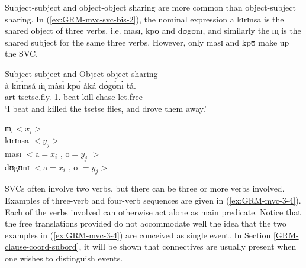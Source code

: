 


Subject-subject and object-object sharing are more common than object-subject
sharing. In (\ref{ex:GRM-mvc-svc-bis-2}), the nominal expression {\sls a 
 kɪrɪnsa} is the shared object of three verbs, i.e. {\sls masɪ}, {\sls kpʊ} and {\sls dʊgʊnɪ}, and similarly the  {\sls m̩} is the shared subject for the same three verbs. However, only {\sls masɪ} and {\sls kpʊ}  make up the SVC. 

\begin{exe}

\ex\label{ex:GRM-mvc-svc-bis-2}{\rm Subject-subject and Object-object sharing}\\
\gll à  kɪ̀rɪ̀nsá   m̩̀   màsɪ̀   kpʊ́ àká dʊ̀gʊ̀nɪ̀ tá.\\
{\sc art}  tsetse.fly.{\pl}   {1.\sg}    beat   kill   {\conn} 
chase   let.free\\
\glt `I beat and killed the tsetse flies, and drove them away.'

{\sls m̩} $<x_i>$\\
{\sls kɪrɪnsa} $<y_j>$\\
{\sls masɪ} $<${\sc a}$ =  x_i$ ,  {\sc o}$=y_j$  $> $\\
{\sls dʊgʊnɪ} $<${\sc a}$ = x_i$ , {\sc o} $= y_j  >$\\
 
\end{exe}

SVCs often involve two verbs, but there can be three or more verbs involved. 
Examples of three-verb and four-verb sequences are given in
(\ref{ex:GRM-mvc-3-4}). Each of the verbs involved can otherwise act alone as
main
predicate. Notice that the free translations provided do not accommodate well
the idea that
the two examples in (\ref{ex:GRM-mvc-3-4}) are conceived as single event.
In Section \ref{GRM-clause-coord-subord},  it will be shown that connectives
are usually present  when one wishes to distinguish events.


\ea\label{ex:GRM-mvc-3-4}


